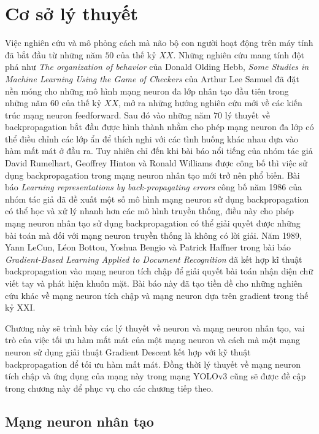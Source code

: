 \chapter{Cơ sở lý thuyết}
Việc nghiên cứu và mô phỏng cách mà não bộ con người hoạt động trên máy tính đã bắt đầu từ những năm $50$ của thế kỷ $XX$. Những nghiên cứu mang tính đột phá như \textit{The organization of behavior}\cite{Hebb:1949} của Donald Olding Hebb, \textit{Some Studies in Machine Learning Using the Game of Checkers}\cite{Arthur:1959:IBM} của Arthur Lee Samuel đã đặt nền móng cho những mô hình mạng neuron đa lớp nhân tạo đầu tiên trong những năm $60$ của thế kỷ $XX$, mở ra những hướng nghiên cứu mới về các kiến trúc mạng neuron feedforward. Sau đó vào những năm $70$ lý thuyết về backpropagation bắt đầu được hình thành nhằm cho phép mạng neuron đa lớp có thể điều chỉnh các lớp ẩn để thích nghi với các tình huống khác nhau dựa vào hàm mất mát ở đầu ra. Tuy nhiên chỉ đến khi bài báo nổi tiếng của nhóm tác giả David Rumelhart, Geoffrey Hinton và Ronald Williams được công bố thì việc sử dụng backpropagation trong mạng neuron nhân tạo mới trở nên phổ biến. Bài báo \textit{Learning representations by back-propagating errors}\cite{DavidEtAl:1986} công bố năm 1986 của nhóm tác giả đã đề xuất một số mô hình mạng neuron sử dụng backpropagation có thể học và xử lý nhanh hơn các mô hình truyền thống, điều này cho phép mạng neuron nhân tạo sử dụng backpropagation có thể giải quyết được những bài toán mà đối với mạng neuron truyền thống là không có lời giải. Năm 1989, Yann LeCun, Léon Bottou, Yoshua Bengio và Patrick Haffner trong bài báo \textit{Gradient-Based Learning Applied to Document Recognition}\cite{LeCunEtAl:1998} đã kết hợp kĩ thuật backpropagation vào mạng neuron tích chập để giải quyết bài toán nhận diện chữ viết tay và phát hiện khuôn mặt. Bài báo này đã tạo tiền đề cho những nghiên cứu khác về mạng neuron tích chập và mạng neuron dựa trên gradient trong thế kỷ XXI.

Chương này sẽ trình bày các lý thuyết về neuron và mạng neuron nhân tạo, vai trò của việc tối ưu hàm mất mát của một mạng neuron và cách mà một mạng neuron sử dụng giải thuật Gradient Descent kết hợp với kỹ thuật backpropagation để tối ưu hàm mất mát. Đồng thời lý thuyết về mạng neuron tích chập và ứng dụng của mạng này trong mạng YOLOv3 cũng sẽ được đề cập trong chương này để phục vụ cho các chương tiếp theo.

\section{Mạng neuron nhân tạo}
